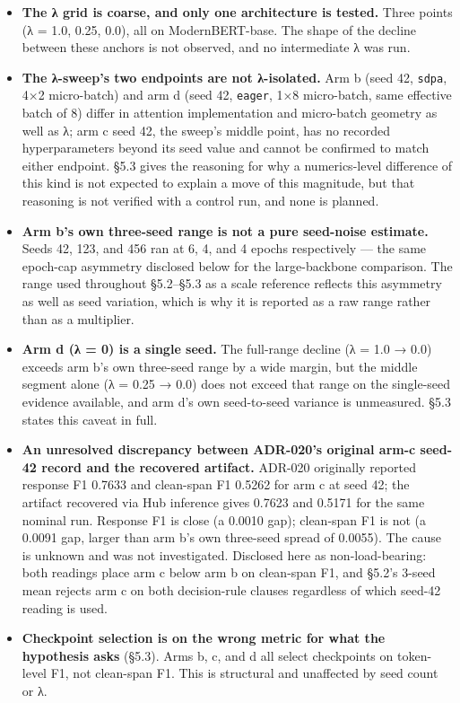 \documentclass[11pt]{article}
\providecommand{\tightlist}{\setlength{\itemsep}{0pt}\setlength{\parskip}{0pt}}
\newcounter{none}
\begin{document}
\begin{itemize}
\tightlist
\item
  \textbf{The λ grid is coarse, and only one architecture is tested.} Three points (λ = 1.0,
  0.25, 0.0), all on ModernBERT-base. The shape of the decline between these anchors is not
  observed, and no intermediate λ was run.
\item
  \textbf{The λ-sweep's two endpoints are not λ-isolated.} Arm b (seed 42, \texttt{sdpa}, 4×2 micro-batch)
  and arm d (seed 42, \texttt{eager}, 1×8 micro-batch, same effective batch of 8) differ in attention
  implementation and micro-batch geometry as well as λ; arm c seed 42, the sweep's middle
  point, has no recorded hyperparameters beyond its seed value and cannot be confirmed to
  match either endpoint. §5.3 gives the reasoning for why a numerics-level difference of this
  kind is not expected to explain a move of this magnitude, but that reasoning is not verified
  with a control run, and none is planned.
\item
  \textbf{Arm b's own three-seed range is not a pure seed-noise estimate.} Seeds 42, 123, and 456
  ran at 6, 4, and 4 epochs respectively --- the same epoch-cap asymmetry disclosed below for
  the large-backbone comparison. The range used throughout §5.2--§5.3 as a scale reference
  reflects this asymmetry as well as seed variation, which is why it is reported as a raw
  range rather than as a multiplier.
\item
  \textbf{Arm d (λ = 0) is a single seed.} The full-range decline (λ = 1.0 → 0.0) exceeds arm b's
  own three-seed range by a wide margin, but the middle segment alone (λ = 0.25 → 0.0) does
  not exceed that range on the single-seed evidence available, and arm d's own seed-to-seed
  variance is unmeasured. §5.3 states this caveat in full.
\item
  \textbf{An unresolved discrepancy between ADR-020's original arm-c seed-42 record and the
  recovered artifact.} ADR-020 originally reported response F1 0.7633 and clean-span F1
  0.5262 for arm c at seed 42; the artifact recovered via Hub inference gives 0.7623 and
  0.5171 for the same nominal run. Response F1 is close (a 0.0010 gap); clean-span F1 is not
  (a 0.0091 gap, larger than arm b's own three-seed spread of 0.0055). The cause is unknown
  and was not investigated. Disclosed here as non-load-bearing: both readings place arm c
  below arm b on clean-span F1, and §5.2's 3-seed mean rejects arm c on both decision-rule
  clauses regardless of which seed-42 reading is used.
\item
  \textbf{Checkpoint selection is on the wrong metric for what the hypothesis asks} (§5.3). Arms
  b, c, and d all select checkpoints on token-level F1, not clean-span F1. This is structural
  and unaffected by seed count or λ.
\end{itemize}
\end{document}
